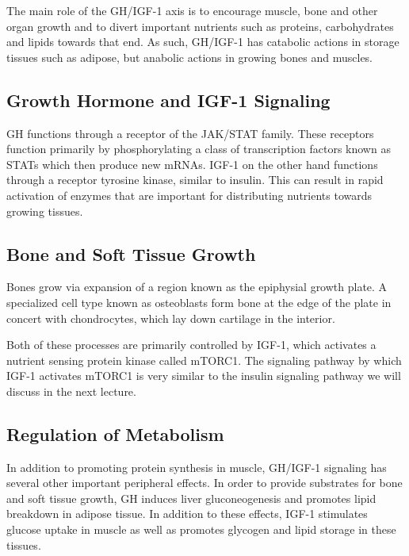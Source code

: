 \documentclass{tufte-handout}
\begin{document}
The main role of the GH/IGF-1 axis is to encourage muscle, bone and other organ growth and to divert important nutrients such as proteins, carbohydrates and lipids towards that end.  As such, GH/IGF-1 has catabolic actions in storage tissues such as adipose, but anabolic actions in growing bones and muscles.

\subsection{Growth Hormone and IGF-1 Signaling}

GH functions through a receptor of the JAK/STAT family.  These receptors function primarily by phosphorylating a class of transcription factors known as STATs which then produce new mRNAs.  IGF-1 on the other hand functions through a receptor tyrosine kinase, similar to insulin.  This can result in rapid activation of enzymes that are important for distributing nutrients towards growing tissues.

\subsection{Bone and Soft Tissue Growth}

Bones grow via expansion of a region known as the epiphysial growth plate.  A specialized cell type known as osteoblasts form bone at the edge of the plate in concert with chondrocytes, which lay down cartilage in the interior.

  Both of these processes are primarily controlled by IGF-1, which activates a nutrient sensing protein kinase called mTORC1.  The signaling pathway by which IGF-1 activates mTORC1 is very similar to the insulin signaling pathway we will discuss in the next lecture.

\subsection{Regulation of Metabolism}

In addition to promoting protein synthesis in muscle, GH/IGF-1 signaling has several other important peripheral effects.  In order to provide substrates for bone and soft tissue growth, GH induces liver gluconeogenesis and promotes lipid breakdown in adipose tissue.  In addition to these effects, IGF-1 stimulates glucose uptake in muscle as well as promotes glycogen and lipid storage in these tissues.
\end{document}

